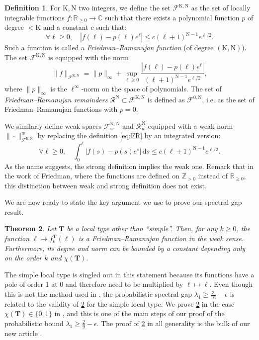 \documentclass[12pt,twoside]{article}
\theoremstyle{theorem}
\newtheorem{thm}{Theorem}[section]
\theoremstyle{remark}
\theoremstyle{definition}
\newtheorem{defi}[thm]{Definition}
\theoremstyle{example}
\newcommand{\R}{\mathbb{R}}
\newcommand{\C}{\mathbb{C}}
\newcommand{\Z}{\mathbb{Z}}
\renewcommand{\d}{\, \mathrm{d}}
\newcommand{\1}[1]{\mathds{1}_{#1}}
\newcommand{\cR}{\mathcal{R}}
\newcommand{\cF}{\mathcal{F}}
\newcommand{\rK}{\mathrm{K}}
\newcommand{\rN}{\mathrm{N}}
\newcommand{\type}{\mathbf{T}}
\begin{document}
\begin{defi}
  For $\rK, \rN$ two integers, we define the set $\cF^{\rK,\rN}$ as the set of locally integrable
  functions $f : \R_{\geq 0} \rightarrow \C$ such that there exists a polynomial function $p$ of degree
  $<\rK$ and a constant $c$ such that:
  \begin{equation}
    \label{eq:FR}
    \forall \ell \geq 0,
    \quad 
    |f(\ell) - p(\ell) e^\ell| \leq c (\ell+1)^{\rN-1} e^{\ell/2}.
  \end{equation}
  Such a function is called a \emph{Friedman--Ramanujan function} (of degree $(\rK,\rN)$).
  The set $\cF^{\rK,\rN}$ is equipped with the norm
  \begin{equation}
    \|f\|_{\cF^{\rK,\rN}}
    = \|p\|_{\infty} + \sup_{\ell \geq 0} \frac{|f(\ell) - p(\ell) e^\ell|}{(\ell+1)^{\rN-1} e^{\ell/2}},
  \end{equation}
  where $\|p\|_{\infty}$ is the $\ell^\infty$-norm on the space of polynomials. The set of
  \emph{Friedman--Ramanujan remainders} $\cR^{\rN} \subset \cF^{\rK,\rN}$ is defined as
  $\cF^{0,\rN}$, i.e. as the set of Friedman--Ramanujan functions with $p=0$.
\end{defi}

We similarly define weak spaces $\cF^{\rK,\rN}_w$ and $\cR^{\rN}_w$ equipped with a weak norm
$\|\cdot \|_{\cF^{\rK,\rN}}^w$ by replacing the definition \eqref{eq:FR} by an integrated version:
\begin{equation}
  \label{eq:FRw}
  \forall \ell \geq 0,
  \quad 
  \int_0^\ell|f(s) - p(s) e^s| \d s \leq c (\ell+1)^{\rN-1} e^{\ell/2}.
\end{equation}
As the name suggests, the strong definition implies the weak one.  Remark that in the work of
Friedman, where the functions are defined on $\Z_{> 0}$ instead of $\R_{\geq 0}$, this distinction
between weak and strong definition does not exist.


We are now ready to state the key argument we use to prove our spectral gap result.

\begin{thm}\label{thm:FR_type}
  Let ${\mathbf{T}}$ be a local type other than ``simple''. Then, for any $k \geq 0$, the function
  $\ell \mapsto f_k^\type(\ell)$ is a Friedman--Ramanujan function in the weak sense. Furthermore,
  its degree and norm can be bounded by a constant depending only on the order $k$ and
  $\chi(\type)$.
\end{thm}

The simple local type is singled out in this statement because its functions have a pole of order
$1$ at $0$ and therefore need to be multiplied by $\ell \mapsto \ell$.  Even though this is not the
method used in \cite{wu2022,lipnowski2024}, the probabilistic spectral gap
$\lambda_1 \geq \frac{3}{16}-\epsilon$ is related to the validity of \cref{thm:FR_type} for the
simple local type.  We prove \cref{thm:FR_type} in the case $\chi(\type) \in \{0, 1\}$ in
\cite{anantharaman2023}, and this is one of the main steps of our proof of the probabilistic bound
$\lambda_1 \geq \frac 29 - \epsilon$. The proof of \cref{thm:FR_type} in all generality is the bulk
of our new article \cite{anantharaman2025}.
\end{document}
